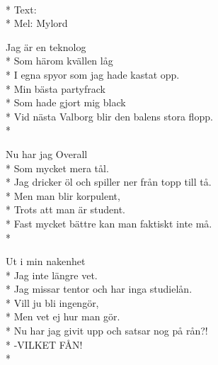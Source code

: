 \begin{SongText}
    \begin{SongInfo}
        \\*%
        Text:\\*%
        Mel: Mylord
    \end{SongInfo}
    \begin{SongVerse}
        Jag är en teknolog\\*%
        Som härom kvällen låg\\*%
        I egna spyor som jag hade kastat opp.\\*%
        Min bästa partyfrack\\*%
        Som hade gjort mig black\\*%
        Vid nästa Valborg blir den balens stora
        flopp.\\*%
    \end{SongVerse}
    \begin{SongVerse}
        Nu har jag Overall\\*%
        Som mycket mera tål.\\*%
        Jag dricker öl och spiller ner från topp
        till tå.\\*%
        Men man blir korpulent,\\*%
        Trots att man är student.\\*%
        Fast mycket bättre kan man faktiskt inte
        må.\\*%
    \end{SongVerse}
    \begin{SongVerse}
        Ut i min nakenhet\\*%
        Jag inte längre vet.\\*%
        Jag missar tentor och har inga studielån.\\*%
        Vill ju bli ingengör,\\*%
        Men vet ej hur man gör.\\*%
        Nu har jag givit upp och satsar nog på rån?!\\*%
        -VILKET FÅN!\\*%
    \end{SongVerse}
\end{SongText}
